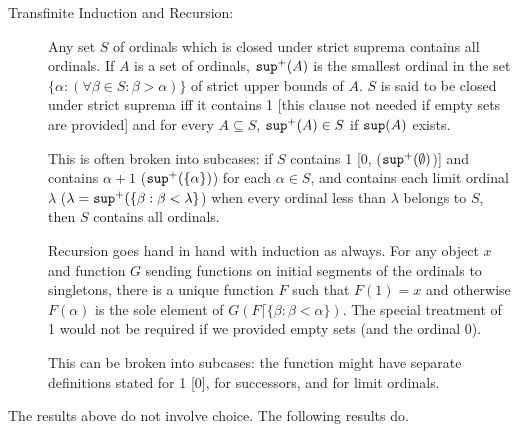 \documentclass[12pt]{article}
\begin{document}
\begin{description}
\item[Transfinite Induction and Recursion:]  Any set $S$ of ordinals which is closed under strict suprema contains all ordinals.  If $A$ is a set of ordinals, ${\tt sup}^+(A)$ is the smallest ordinal in the set $\{\alpha:(\forall \beta \in S:\beta > \alpha)\}$ of strict upper bounds of $A$.   $S$ is said to be closed under strict suprema iff it contains 1 [this clause not needed if empty sets are provided] and  for every $A \subseteq S$, ${\tt sup}^+(A) \in S$ if ${\tt sup}(A)$ exists.

This is often broken into subcases:  if $S$ contains 1 [0, (${\tt sup}^+(\emptyset)$)] and contains $\alpha+1$ (${\tt sup}^+(\{\alpha\})$) for each $\alpha\in S$, and contains each limit ordinal $\lambda$ ($\lambda = {\tt sup}^+(\{\beta:\beta<\lambda\}$) when every ordinal less than $\lambda$ belongs to $S$, then $S$ contains all ordinals.

Recursion goes hand in hand with induction as always.  For any object $x$ and function $G$ sending functions on initial segments of the ordinals to singletons, there is a unique function $F$ such that $F(1)=x$ and otherwise $F(\alpha)$ is the sole element of $G(F \lceil \{\beta:\beta<\alpha\})$.  The special treatment of 1 would not be required if we provided empty sets (and the ordinal 0).

This can be broken into subcases:  the function might have separate definitions stated for 1 [0], for successors, and for limit ordinals.

\end{description}

The results above do not involve choice.  The following results do.
\end{document}
